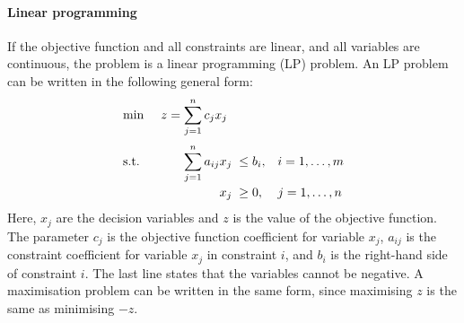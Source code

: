 \paragraph{Linear programming}
If the objective function and all constraints are linear, and all variables are continuous, the problem is a linear programming (LP) problem. An LP problem can be written in the following general form:
\begin{equation}
\begin{array}{@{}l@{\hspace{3.2em}}l@{\;\;}l@{\quad}l@{}}
\min & \llap{$z={}$}{\displaystyle\sum_{j=1}^{n}}\, c_j x_j & & \\[4ex]
\text{s.t.} & {\displaystyle\sum_{j=1}^{n}}\, a_{ij} x_j & \le b_i, & i = 1,\ldots,m\\[3ex]
 & \multicolumn{1}{r@{\;\;}}{x_j} & \ge 0, & j = 1,\ldots,n
\end{array}
\label{eq:lp_general}
\end{equation}
Here, $x_j$ are the decision variables and $z$ is the value of the objective function. The parameter $c_j$ is the objective function coefficient for variable $x_j$, $a_{ij}$ is the constraint coefficient for variable $x_j$ in constraint $i$, and $b_i$ is the right-hand side of constraint $i$. The last line states that the variables cannot be negative. A maximisation problem can be written in the same form, since maximising $z$ is the same as minimising $-z$.


